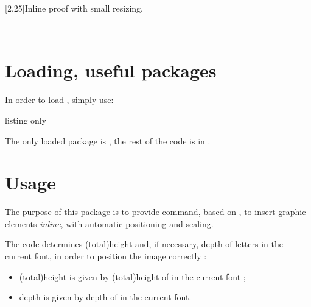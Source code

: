 \documentclass[11pt,a4paper]{ltxdoc}
\begin{document}
\begin{tcolorbox}[colframe=lightgray,colback=lightgray!5]
\scalebox{2.25}[2.25]{Inline  proof with small resizing.}
\end{tcolorbox}

\begin{tcolorbox}[colframe=lightgray,colback=lightgray!5]
\end{tcolorbox}

\vfill~

\vspace*{5mm}

\pagebreak


\hypertarget{matoc}{}

\tableofcontents

\vspace*{5mm}


\pagebreak

\section{Loading, useful packages}

In order to load , simply use:

\begin{DemoCode}{listing only}
\usepackage{inlinegraphicx}
\end{DemoCode}

The only loaded package is , the rest of the code is in .

\section{Usage}

The purpose of this package is to provide command, based on , to insert graphic elements \textit{inline}, with automatic positioning and scaling.

\smallskip

The code determines (total)height and, if necessary, depth of letters in the current font, in order to position the image correctly :

\begin{itemize}
	\item (total)height is given by (total)height of {\setlength\fboxsep{0pt}} in the current font ;
	\item depth is given by depth of {\setlength\fboxsep{0pt}} in the current font.
\end{itemize}
\end{document}

